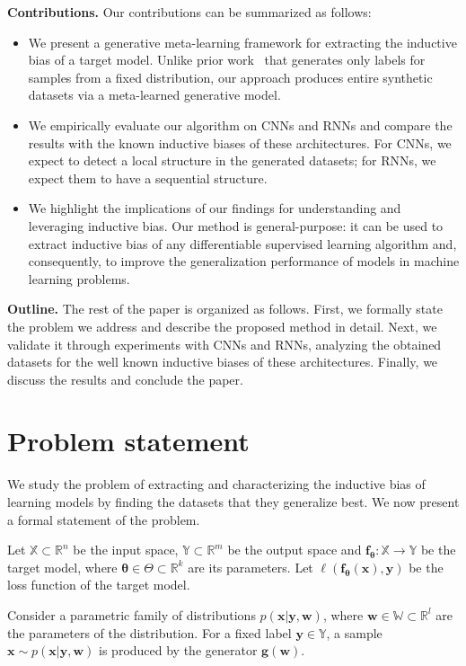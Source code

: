 \documentclass{article}
\begin{document}
\textbf{Contributions.} Our contributions can be summarized as follows:
\begin{itemize}
    \item We present a generative meta-learning framework for extracting the inductive bias of a target model. Unlike prior work~\cite{dorrell2023metalearninginductivebiasessimple} that generates only labels for samples from a fixed distribution, our approach produces entire synthetic datasets via a meta-learned generative model.
    \item We empirically evaluate our algorithm on CNNs and RNNs and compare the results with the known inductive biases of these architectures. For CNNs, we expect to detect a local structure in the generated datasets; for RNNs, we expect them to have a sequential structure.
    \item We highlight the implications of our findings for understanding and leveraging inductive bias. Our method is general-purpose: it can be used to extract inductive bias of any differentiable supervised learning algorithm and, consequently, to improve the generalization performance of models in machine learning problems.
\end{itemize}

\textbf{Outline.} The rest of the paper is organized as follows. First, we formally state the problem we address and describe the proposed method in detail. Next, we validate it through experiments with CNNs and RNNs, analyzing the obtained datasets for the well known inductive biases of these architectures. Finally, we discuss the results and conclude the paper.

\section{Problem statement}\label{sec:prostate}
We study the problem of extracting and characterizing the inductive bias of learning models by finding the datasets that they generalize best. We now present a formal statement of the problem.

Let \(\mathbb{X} \subset \mathbb{R}^n\) be the input space, \(\mathbb{Y} \subset \mathbb{R}^m\) be the output space and \(\mathbf{f}_{\boldsymbol{\theta}}  : \mathbb{X} \to \mathbb{Y}\) be the target model, where $\boldsymbol{\theta} \in \Theta \subset \mathbb{R}^k$ are its parameters. Let \(\ell(\mathbf{f}_{\boldsymbol{\theta}}(\mathbf{x}), \mathbf{y})\) be the loss function of the target model.

Consider a parametric family of distributions \(p(\mathbf{x} | \mathbf{y}, \mathbf{w})\), where $\mathbf{w} \in \mathbb{W} \subset \mathbb{R}^l$ are the parameters of the distribution. For a fixed label \(\mathbf{y} \in \mathbb{Y}\), a sample \(\mathbf{x} \sim p(\mathbf{x} | \mathbf{y}, \mathbf{w})\) is produced by the generator $\mathbf{g}(\mathbf{w})$.
\end{document}
